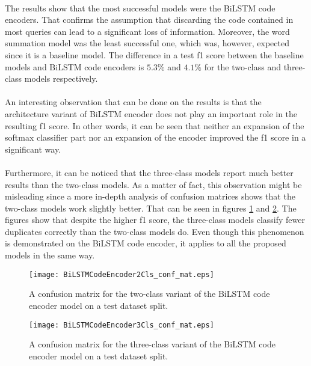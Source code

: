 \paragraph{}
The results show that the most successful models were the BiLSTM code encoders. That confirms the assumption that discarding the code contained in most queries can lead to a significant loss of information. Moreover, the word summation model was the least successful one, which was, however, expected since it is a baseline model. The difference in a test f1 score between the baseline models and BiLSTM code encoders is $5.3\%$ and $4.1\%$ for the two-class and three-class models respectively.

\paragraph{}
An interesting observation that can be done on the results is that the architecture variant of BiLSTM encoder does not play an important role in the resulting f1 score. In other words, it can be seen that neither an expansion of the softmax classifier part nor an expansion of the encoder improved the f1 score in a significant way.

\paragraph{}
Furthermore, it can be noticed that the three-class models report much better results than the two-class models. As a matter of fact, this observation might be misleading since a more in-depth analysis of confusion matrices shows that the two-class models work slightly better. That can be seen in figures \ref{bi_lstm_code_encoder_2cls_conf_mat} and \ref{bi_lstm_code_encoder_3cls_conf_mat}. The figures show that despite the higher f1 score, the three-class models classify fewer duplicates correctly than the two-class models do. Even though this phenomenon is demonstrated on the BiLSTM code encoder, it applies to all the proposed models in the same way.

\begin{figure}[!h]
	\texttt{[image: BiLSTMCodeEncoder2Cls\_conf\_mat.eps]}
	\centering
	\caption{A confusion matrix for the two-class variant of the BiLSTM code encoder model on a test dataset split.}
	\label{bi_lstm_code_encoder_2cls_conf_mat}
\end{figure}

\begin{figure}[!h]
	\texttt{[image: BiLSTMCodeEncoder3Cls\_conf\_mat.eps]}
	\centering
	\caption{A confusion matrix for the three-class variant of the BiLSTM code encoder model on a test dataset split.}
	\label{bi_lstm_code_encoder_3cls_conf_mat}
\end{figure}

